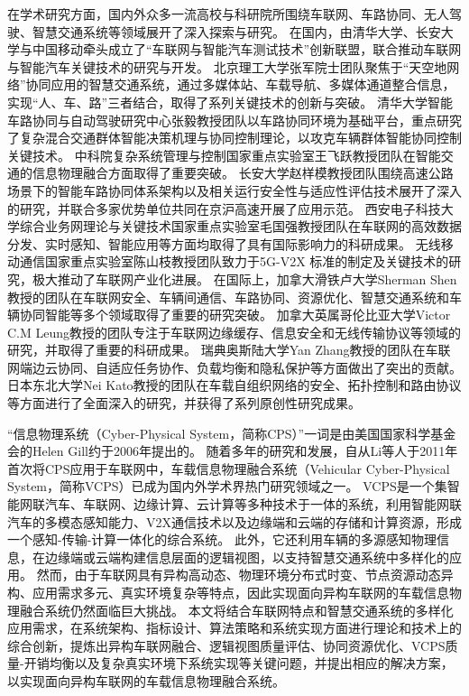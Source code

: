 在学术研究方面，国内外众多一流高校与科研院所围绕车联网、车路协同、无人驾驶、智慧交通系统等领域展开了深入探索与研究。
在国内，由清华大学、长安大学与中国移动牵头成立了“车联网与智能汽车测试技术”创新联盟，联合推动车联网与智能汽车关键技术的研究与开发。
北京理工大学张军院士团队聚焦于“天空地网络”协同应用的智慧交通系统，通过多媒体站、车载导航、多媒体通道整合信息，实现“人、车、路”三者结合，取得了系列关键技术的创新与突破。
清华大学智能车路协同与自动驾驶研究中心张毅教授团队以车路协同环境为基础平台，重点研究了复杂混合交通群体智能决策机理与协同控制理论，以攻克车辆群体智能协同控制关键技术。
中科院复杂系统管理与控制国家重点实验室王飞跃教授团队在智能交通的信息物理融合方面取得了重要突破。
长安大学赵样模教授团队围绕高速公路场景下的智能车路协同体系架构以及相关运行安全性与适应性评估技术展开了深入的研究，并联合多家优势单位共同在京沪高速开展了应用示范。
西安电子科技大学综合业务网理论与关键技术国家重点实验室毛国强教授团队在车联网的高效数据分发、实时感知、智能应用等方面均取得了具有国际影响力的科研成果。
无线移动通信国家重点实验室陈山枝教授团队致力于5G-V2X 标准的制定及关键技术的研究，极大推动了车联网产业化进展。
在国际上，加拿大滑铁卢大学Sherman Shen教授的团队在车联网安全、车辆间通信、车路协同、资源优化、智慧交通系统和车辆协同智能等多个领域取得了重要的研究突破。
加拿大英属哥伦比亚大学Victor C.M Leung教授的团队专注于车联网边缘缓存、信息安全和无线传输协议等领域的研究，并取得了重要的科研成果。
瑞典奥斯陆大学Yan Zhang教授的团队在车联网端边云协同、自适应任务协作、负载均衡和隐私保护等方面做出了突出的贡献。
日本东北大学Nei Kato教授的团队在车载自组织网络的安全、拓扑控制和路由协议等方面进行了全面深入的研究，并获得了系列原创性研究成果。

“信息物理系统（Cyber-Physical System，简称CPS）”一词是由美国国家科学基金会的Helen Gill约于2006年提出的\cite{lee2016introduction}。
随着多年的研究和发展，自从Li等人于2011年首次将CPS应用于车联网中，车载信息物理融合系统（Vehicular Cyber-Physical System，简称VCPS）\cite{li2011human}已成为国内外学术界热门研究领域之一。
VCPS是一个集智能网联汽车、车联网、边缘计算、云计算等多种技术于一体的系统，利用智能网联汽车的多模态感知能力、V2X通信技术以及边缘端和云端的存储和计算资源，形成一个感知-传输-计算一体化的综合系统。
此外，它还利用车辆的多源感知物理信息，在边缘端或云端构建信息层面的逻辑视图，以支持智慧交通系统中多样化的应用。
然而，由于车联网具有异构高动态、物理环境分布式时变、节点资源动态异构、应用需求多元、真实环境复杂等特点，因此实现面向异构车联网的车载信息物理融合系统仍然面临巨大挑战。
本文将结合车联网特点和智慧交通系统的多样化应用需求，在系统架构、指标设计、算法策略和系统实现方面进行理论和技术上的综合创新，提炼出异构车联网融合、逻辑视图质量评估、协同资源优化、VCPS质量-开销均衡以及复杂真实环境下系统实现等关键问题，并提出相应的解决方案，以实现面向异构车联网的车载信息物理融合系统。

